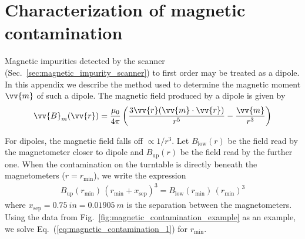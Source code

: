 
\chapter{Characterization of magnetic contamination}\label{appx:magnetic_contamination}


Magnetic impurities detected by the scanner (Sec.~\ref{sec:magnetic_impurity_scanner}) to first order may be treated as a dipole. In this appendix we describe the method used to determine the magnetic moment $\vv{m}$ of such a dipole. The magnetic field produced by a dipole is given by \cite{chow2006introduction}
%
\begin{gather}
    \vv{B}_m({\vv{r}}) = \frac{\mu_{0}}{4\pi}\left(\frac{3\vv{r}(\vv{m}\cdot\vv{r})}{r^{5}} - \frac{{\vv{m}}}{r^{3}}\right)
\end{gather}

For dipoles, the magnetic field falls off $\propto 1/r^3$. Let $B_\text{low}(r)$ be the field read by the magnetometer closer to dipole and $B_\text{up}(r)$ be the field read by the further one. When the contamination on the turntable is directly beneath the magnetometers ($r=r_\text{min}$), we write the expression
%
\begin{gather}
    B_\text{up}(r_\text{min})\,(r_\text{min} + x_\text{sep})^3 = B_\text{low}(r_\text{min})\,(r_\text{min})^3 \label{eq:magnetic_contamination_1}
\end{gather}
%
where $x_\text{sep}=\qty{0.75}{in}=\qty{0.01905}{m}$ is the separation between the magnetometers. Using the data from Fig.~\ref{fig:magnetic_contamination_example} as an example, we solve Eq.~(\ref{eq:magnetic_contamination_1}) for $r_\text{min}$.
%

